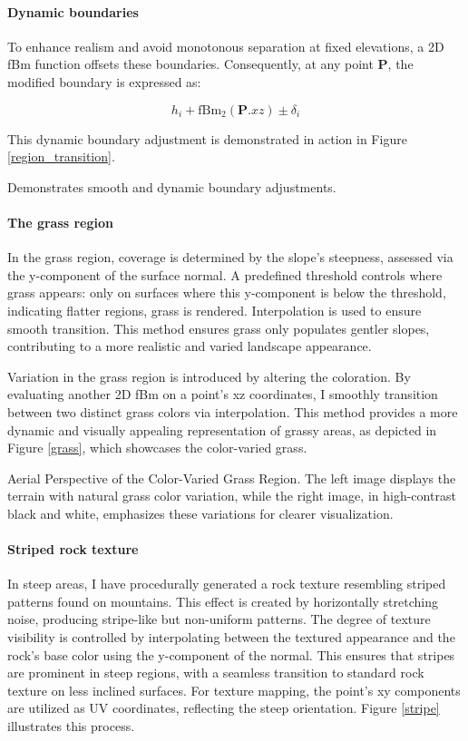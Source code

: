 \paragraph{Dynamic boundaries}
To enhance realism and avoid monotonous separation at fixed elevations, a 2D fBm function offsets these boundaries. Consequently, at any point $\mathbf{P}$, the modified boundary is expressed as:

\begin{equation}
    h_{i} + \text{fBm}_{2}(\mathbf{P}.xz) \pm \delta_i
\end{equation}

This dynamic boundary adjustment is demonstrated in action in Figure \ref{region_transition}.

{Demonstrates smooth and dynamic boundary adjustments.}

\paragraph{The grass region}
In the grass region, coverage is determined by the slope's steepness, assessed via the y-component of the surface normal. A predefined threshold controls where grass appears: only on surfaces where this y-component is below the threshold, indicating flatter regions, grass is rendered. Interpolation is used to ensure smooth transition. This method ensures grass only populates gentler slopes, contributing to a more realistic and varied landscape appearance.

Variation in the grass region is introduced by altering the coloration. By evaluating another 2D fBm on a point's xz coordinates, I smoothly transition between two distinct grass colors via interpolation. This method provides a more dynamic and visually appealing representation of grassy areas, as depicted in Figure \ref{grass}, which showcases the color-varied grass.

{Aerial Perspective of the Color-Varied Grass Region. The left image displays the terrain with natural grass color variation, while the right image, in high-contrast black and white, emphasizes these variations for clearer visualization.}

\paragraph{Striped rock texture}
In steep areas, I have procedurally generated a rock texture resembling striped patterns found on mountains. This effect is created by horizontally stretching noise, producing stripe-like but non-uniform patterns. The degree of texture visibility is controlled by interpolating between the textured appearance and the rock's base color using the y-component of the normal. This ensures that stripes are prominent in steep regions, with a seamless transition to standard rock texture on less inclined surfaces. For texture mapping, the point's xy components are utilized as UV coordinates, reflecting the steep orientation. Figure \ref{stripe} illustrates this process.

